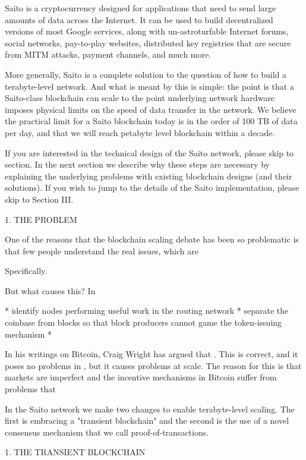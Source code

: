\documentclass[12pt, oneside]{article}   	%
\begin{document}
\begin{multicols}{2}
Saito is a cryptocurrency designed for applications that need to send large amounts of data across the Internet. It can be used to build decentralized versions of most Google services, along with un-astroturfable Internet forums, social networks, pay-to-play websites, distributed key registries that are secure from MITM attacks, payment channels, and much more.

More generally, Saito is a complete solution to the question of how to build a terabyte-level network. And what is meant by this is simple: the point is that a Saito-class blockchain can scale to the point underlying network hardware imposes physical limits on the speed of data transfer in the network. We believe the practical limit for a Saito blockchain today is in the order of 100 TB of data per day, and that we will reach petabyte level blockchain within a decade.

If you are interested in the technical design of the Saito network, please skip to section. In the next section we describe why these steps are necessary by explaining the underlying problems with existing blockchain designs (and their solutions). If you wish to jump to the details of the Saito implementation, please skip to Section III.


1. THE PROBLEM

One of the reasons that the blockchain scaling debate has been so problematic is that few people understand the real issues, which are 

Specifically.


But what causes this? In 

* identify nodes performing useful work in the routing network
* separate the coinbase from blocks so that block producers cannot game the token-issuing mechanism
*

In his writings on Bitcoin, Craig Wright has argued that . This is correct, and it poses no problems in , but it causes problems at scale. The reason for this is that markets are imperfect and the incentive mechanisms in Bitcoin suffer from problems that 





In the Saito network we make two changes to enable terabyte-level scaling. The first is embracing a "transient blockchain" and the second is the use of a novel consensus mechanism that we call proof-of-transactions. 

1. THE TRANSIENT BLOCKCHAIN


\end{multicols}
\end{document}
